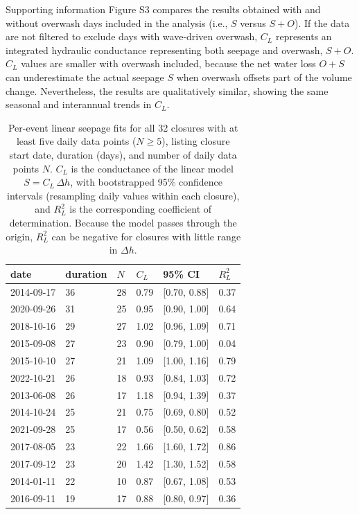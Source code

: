 \documentclass[preprint,12pt,authoryear]{elsarticle}
\begin{document}
Supporting information Figure S3 compares the results obtained with and without overwash days included in the analysis (i.e., $S$ versus $S + O$). If the data are not filtered to exclude days with wave-driven overwash, $C_L$ represents an integrated hydraulic conductance representing both seepage and overwash, $S + O$. $C_L$ values are smaller with overwash included, because the net water loss $O + S$ can underestimate the actual seepage $S$ when overwash offsets part of the volume change.
Nevertheless, the results are qualitatively similar, showing the same seasonal and interannual trends in $C_L$.

\begin{table}[]
    \centering
\caption{Per-event linear seepage fits for all 32 closures with at least five daily data points ($N \ge 5$), listing closure start date, duration (days), and number of daily data points $N$. $C_L$ is the conductance of the linear model $S = C_L\,\Delta h$, with bootstrapped 95\% confidence intervals (resampling daily values within each closure), and $R^2_L$ is the corresponding coefficient of determination. Because the model passes through the origin, $R^2_L$ can be negative for closures with little range in $\Delta h$.}
    \small
\begin{tabular}{lll|lll}
\hline
date & duration & $N$ & $C_L$ & 95\% CI & $R^2_L$ \\
\hline
2014-09-17 & 36 & 28 & 0.79 & [0.70, 0.88] & 0.37 \\
2020-09-26 & 31 & 25 & 0.95 & [0.90, 1.00] & 0.64 \\
2018-10-16 & 29 & 27 & 1.02 & [0.96, 1.09] & 0.71 \\
2015-09-08 & 27 & 23 & 0.90 & [0.79, 1.00] & 0.04 \\
2015-10-10 & 27 & 21 & 1.09 & [1.00, 1.16] & 0.79 \\
2022-10-21 & 26 & 18 & 0.93 & [0.84, 1.03] & 0.72 \\
2013-06-08 & 26 & 17 & 1.18 & [0.94, 1.39] & 0.37 \\
2014-10-24 & 25 & 21 & 0.75 & [0.69, 0.80] & 0.52 \\
2021-09-28 & 25 & 17 & 0.56 & [0.50, 0.62] & 0.58 \\
2017-08-05 & 23 & 22 & 1.66 & [1.60, 1.72] & 0.86 \\
2017-09-12 & 23 & 20 & 1.42 & [1.30, 1.52] & 0.58 \\
2014-01-11 & 22 & 10 & 0.87 & [0.67, 1.08] & 0.53 \\
2016-09-11 & 19 & 17 & 0.88 & [0.80, 0.97] & 0.36 \\

\end{tabular}
\end{table}
\end{document}
